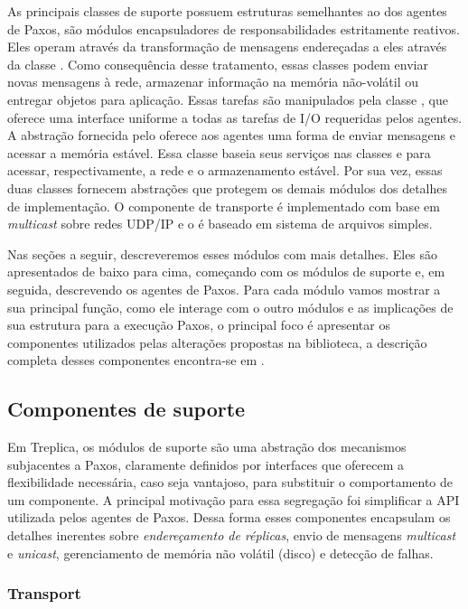 As principais classes de suporte possuem estruturas semelhantes ao dos agentes de Paxos,
são módulos encapsuladores de responsabilidades estritamente reativos. Eles operam através
da transformação de mensagens endereçadas a eles através da classe .
Como consequência desse tratamento, essas classes podem enviar novas mensagens à rede,
armazenar informação na memória não-volátil ou entregar objetos para aplicação. Essas
tarefas são manipulados pela classe , que oferece uma interface
uniforme a todas as tarefas de I/O requeridas pelos agentes. A abstração fornecida pelo
 oferece aos agentes uma forma de enviar mensagens e acessar a
memória estável. Essa classe baseia seus serviços nas classes  e
 para acessar, respectivamente, a rede e o armazenamento estável. Por
sua vez, essas duas classes fornecem abstrações que protegem os demais módulos dos
detalhes de implementação. O componente de transporte é implementado com base em
\emph{multicast} sobre redes UDP/IP e o  é baseado em sistema de
arquivos simples.

Nas seções a seguir, descreveremos esses módulos com mais detalhes. Eles são apresentados
de baixo para cima, começando com os módulos de suporte e, em seguida, descrevendo os
agentes de Paxos. Para cada módulo vamos mostrar a sua principal função, como ele interage
com o outro módulos e as implicações de sua estrutura para a execução Paxos, o principal
foco é apresentar os componentes utilizados pelas alterações propostas na biblioteca, a
descrição completa desses componentes encontra-se em .

\subsection{Componentes de suporte}

Em Treplica, os módulos de suporte são uma abstração dos mecanismos subjacentes a Paxos,
claramente definidos por interfaces que oferecem a flexibilidade necessária, caso seja
vantajoso, para substituir o comportamento de um componente. A principal motivação para
essa segregação foi simplificar a API utilizada pelos agentes de Paxos. Dessa forma esses
componentes encapsulam os detalhes inerentes sobre \emph{endereçamento de réplicas}, envio
de mensagens \emph{multicast} e \emph{unicast}, gerenciamento de memória não volátil
(disco) e detecção de falhas.

\subsubsection{Transport}\label{subsec:transport}

